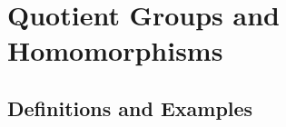 \documentclass[a4paper]{article}
\begin{document}
\begin{ex}{}{}
\end{ex} 

\pagebreak
\section{Quotient Groups and Homomorphisms}
\subsection{Definitions and Examples}

\begin{ex}{}{}
\end{ex} 

\begin{ex}{}{}
\end{ex} 

\begin{ex}{}{}
\end{ex} 

\begin{ex}{}{}
\end{ex} 

\begin{ex}{}{}
\end{ex} 

\begin{ex}{}{}
\end{ex} 

\begin{ex}{}{}
\end{ex} 

\begin{ex}{}{}
\end{ex} 

\begin{ex}{}{}
\end{ex} 

\begin{ex}{}{}
\end{ex} 

\begin{ex}{}{}
\end{ex} 

\begin{ex}{}{}
\end{ex} 

\begin{ex}{}{}
\end{ex} 

\begin{ex}{}{}
\end{ex} 
\end{document}
